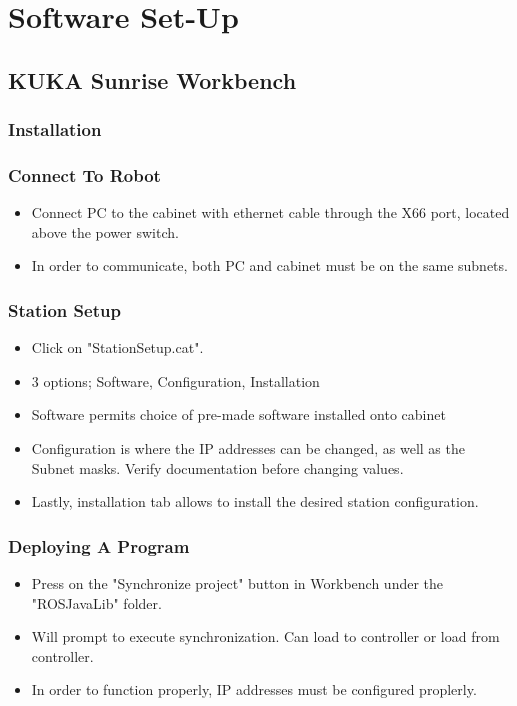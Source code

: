 \documentclass[12pt, letterpaper]{article}
\begin{document}
\section{Software Set-Up}
\subsection{KUKA Sunrise Workbench}
\subsubsection{Installation}
\subsubsection{Connect To Robot}
\begin{itemize}
    \item Connect PC to the cabinet with ethernet cable through the X66 port, located above the power switch.
    \item In order to communicate, both PC and cabinet must be on the same subnets. 
\end{itemize}
\subsubsection{Station Setup}
\begin{itemize}
    \item Click on "StationSetup.cat".
    \item 3 options; Software, Configuration, Installation
    \item Software permits choice of pre-made software installed onto cabinet
    \item Configuration is where the IP addresses can be changed, as well as the Subnet masks. Verify documentation before changing values.
    \item Lastly, installation tab allows to install the desired station configuration.
\end{itemize}
\subsubsection{Deploying A Program}
\begin{itemize}
    \item Press on the "Synchronize project" button in Workbench under the "ROSJavaLib" folder. 
    \item Will prompt to execute synchronization. Can load to controller or load from controller. 
    \item In order to function properly, IP addresses must be configured proplerly. 
\end{itemize}
\end{document}
